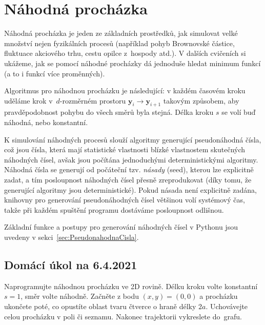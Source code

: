 \documentclass[a4paper,11pt,twoside]{article}
\def\vector#1{\boldsymbol{#1}}								%
\theoremstyle{red}
\theoremstyle{green}
\begin{document}
\section{Náhodná procházka}\label{sec:NahodnaProchazka}
    Náhodná procházka je jeden ze základních prostředků, jak simulovat velké množství nejen fyzikálních procesů (například pohyb Brownovské částice, fluktuace akciového trhu, cestu opilce z~hospody atd.).
    V dalších cvičeních si ukážeme, jak se pomocí náhodné procházky dá jednoduše hledat minimum funkcí (a to i funkcí více proměnných). 

    Algoritmus pro náhodnou procházku je následující: v každém časovém kroku uděláme krok v~$d$-rozměrném prostoru $\vector{y}_{i}\rightarrow\vector{y}_{i+1}$ takovým způsobem, aby pravděpodobnost pohybu do všech směrů byla stejná.
    Délka kroku $s$ se volí buď náhodná, nebo konstantní.

    K simulování náhodných procesů slouží algoritmy generující pseudonáhodná čísla, což jsou čísla, která mají statistické vlastnosti blízké vlastnostem skutečných náhodných čísel, avšak jsou počítána jednoduchými deterministickými algoritmy.
    Náhodná čísla se generují od počáteční tzv. \emph{násady} (seed), kterou lze explicitně zadat, a tím posloupnost náhodných čísel přesně zreprodukovat (díky tomu, že generující algoritmy jsou deterministické).
    Pokud násada není explicitně zadána, knihovny pro generování pseudonáhodných čísel většinou volí systémový čas, takže při každém spuštění programu dostáváme posloupnost odlišnou.

    Základní funkce a postupy pro generování náhodných čísel v Pythonu jsou uvedeny v sekci~\ref{sec:PseudonahodnaCisla}.

    {\color{red}\subsection{Domácí úkol na 6.4.2021}}
    \begin{task}
        Naprogramujte náhodnou procházku ve 2D rovině.
        Délku kroku volte konstantní $s=1$, směr volte náhodně.
        Začněte z bodu $(x,y)=(0,0)$ a procházku ukončete poté, co opustíte oblast tvaru čtverce o hraně délky $2a$.
        Uchovávejte celou procházku v poli či seznamu.
        Nakonec trajektorii vykreslete do~grafu.
    \end{task}
\end{document}
